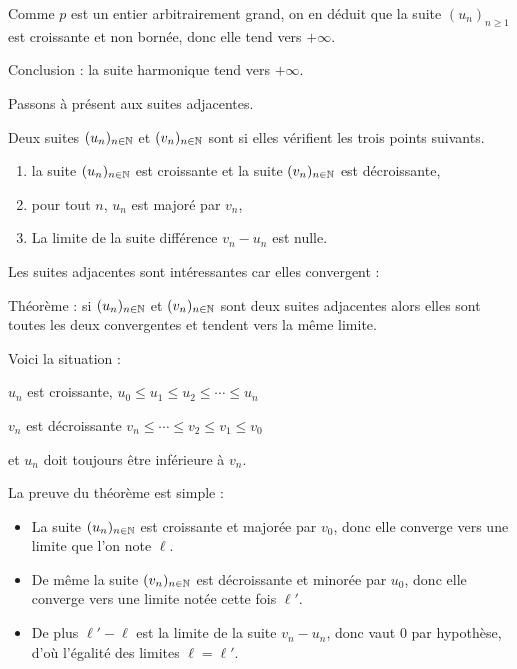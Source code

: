 \change

Comme $p$ est un entier arbitrairement grand, 
on en déduit que la suite  $(u_n)_{n\geq 1}$ est croissante 
et non bornée, donc elle tend vers $+\infty$.   

Conclusion : la suite harmonique tend vers $+\infty$.

\diapo

Passons à présent aux suites adjacentes.


Deux suites $(u_n)_{n\in \mathbb{N}}$ et $(v_n)_{n\in \mathbb{N}}$ sont  si
elles vérifient les trois points suivants. 

\begin{enumerate}
  \item la suite $(u_n)_{n\in \mathbb{N}}$ est croissante et la suite $(v_n)_{n\in \mathbb{N}}$ est décroissante,
  \item pour tout $n$, $u_n$ est majoré par  $v_n$,
  \item La limite de la suite différence $v_n-u_n$ est nulle.
\end{enumerate}

\change

Les suites adjacentes sont intéressantes car elles convergent :

Théorème : si $(u_n)_{n\in \mathbb{N}}$ et $(v_n)_{n\in \mathbb{N}}$ 
sont deux suites adjacentes alors elles sont toutes les deux convergentes 
et tendent vers la même limite.

\change

Voici la situation :

$u_n$ est croissante, $u_0 \le u_1 \le u_2 \le \cdots \le u_n $

$v_n$ est décroissante $v_n\le \cdots \le v_2 \le v_1 \le v_0$

et $u_n$ doit toujours être inférieure à $v_n$.


\change

La preuve du théorème est simple :

 \begin{itemize}
    \item La suite $(u_n)_{n\in \mathbb{N}}$ est croissante et majorée par $v_0$, 
    donc elle converge vers une limite que l'on note $\ell$.

\change 
    
\item De même la suite $(v_n)_{n\in \mathbb{N}}$ est décroissante et minorée par $u_0$, 
    donc elle converge vers une limite notée cette fois $\ell'$.

\change

    \item De plus  $\ell'-\ell$ est la limite de la suite 
    $v_n -u_n$, donc vaut $0$ par hypothèse, d'où l'égalité des limites $\ell=\ell'$.
  \end{itemize}

